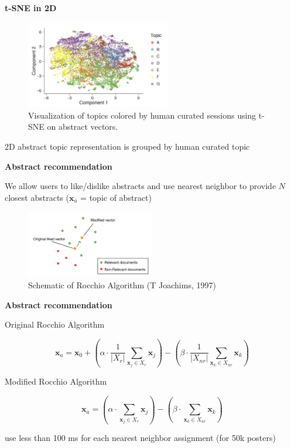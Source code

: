 \begin{frame}{\textbf{t-SNE in 2D}}

\begin{figure}
\includegraphics[width=2.5in]{images/tsne}\\
\tiny{Visualization of topics colored by human curated sessions using t-SNE on abstract vectors.}
\end{figure}

2D abstract topic representation is grouped by human curated topic

\end{frame}


\begin{frame}{\textbf{Abstract recommendation}}

We allow users to like/dislike abstracts and use nearest neighbor to provide $N$ closest abstracts ($\mathbf{x}_a$ = topic of abstract)

\begin{figure}
\includegraphics[width=2.2in]{images/rocchio}\\
\tiny{Schematic of Rocchio Algorithm (T Joachims, 1997)}
\end{figure}

\end{frame}


\begin{frame}{\textbf{Abstract recommendation}}

Original Rocchio Algorithm

\begin{equation*}
\mathbf{x}_a = \mathbf{x}_0 + (\alpha \cdot \frac{1}{\left| X_r \right|} \sum_{\mathbf{x}_j \in X_r} \mathbf{x}_j) - (\beta \cdot \frac{1}{\left| X_{nr} \right|} \sum_{\mathbf{x}_k \in X_{nr}} \mathbf{x}_k)
\end{equation*}

Modified Rocchio Algorithm

\begin{equation*}
\mathbf{x}_a = (\alpha \cdot \sum_{\mathbf{x}_j \in X_r} \mathbf{x}_j) - (\beta \cdot \sum_{\mathbf{x}_k \in X_{nr}} \mathbf{x}_k)
\end{equation*}

use less than 100 ms for each nearest neighbor assignment (for 50k posters)

\end{frame}
